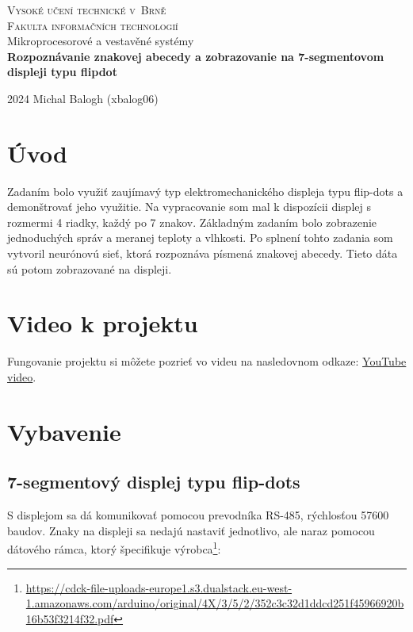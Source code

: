 \documentclass[a4paper, 12pt]{article}
\begin{document}
\begin{titlepage}
	\begin{center}
		{\Huge 
        \textsc{Vysoké učení technické v~Brně}\\[0.5em]}
		{\huge 
        \textsc{Fakulta informačních technologií}}\\
		{\Large Mikroprocesorové a vestavěné systémy}\\[0.6em]
        {\LARGE \textbf{Rozpoznávanie znakovej abecedy a zobrazovanie na 7-segmentovom displeji typu flipdot}}
	\end{center}
	{\Large 2024 \hfill 
    Michal Balogh (xbalog06) }
\end{titlepage}

\tableofcontents

\newpage


\section{Úvod}

Zadaním bolo využiť zaujímavý typ elektromechanického displeja typu flip-dots a demonštrovať jeho využitie. Na vypracovanie som mal k dispozícii displej s rozmermi 4 riadky, každý po 7 znakov. Základným zadaním bolo zobrazenie jednoduchých správ a meranej teploty a vlhkosti. Po splnení tohto zadania som vytvoril neurónovú sieť, ktorá rozpoznáva písmená znakovej abecedy. Tieto dáta sú potom zobrazované na displeji.

\section{Video k projektu}

Fungovanie projektu si môžete pozrieť vo videu na nasledovnom odkaze: \href{https://www.youtube.com/watch?v=IdzLrns7vJk}{YouTube video}.

\section{Vybavenie}

\subsection{7-segmentový displej typu flip-dots}

S displejom sa dá komunikovať pomocou prevodníka RS-485, rýchlosťou 57600 baudov. Znaky na displeji sa nedajú nastaviť jednotlivo, ale naraz pomocou dátového rámca, ktorý špecifikuje výrobca\footnote{\url{https://cdck-file-uploads-europe1.s3.dualstack.eu-west-1.amazonaws.com/arduino/original/4X/3/5/2/352c3c32d1ddcd251f45966920b16b53f3214f32.pdf}}:
\end{document}
